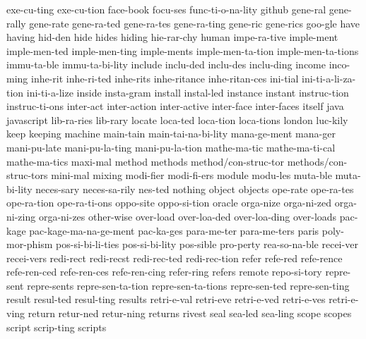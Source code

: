 {    exe-cu-ting
    exe-cu-tion
    face-book
    focu-ses
    func-ti-o-na-lity
    github
    gene-ral
    gene-rally
    gene-rate
    gene-ra-ted
    gene-ra-tes
    gene-ra-ting
    gene-ric
    gene-rics
    goo-gle
    have
    having
    hid-den
    hide
    hides
    hiding
    hie-rar-chy
    human
    impe-ra-tive
    imple-ment
    imple-men-ted
    imple-men-ting
    imple-ments
    imple-men-ta-tion
    imple-men-ta-tions
    immu-ta-ble
    immu-ta-bi-lity
    include
    inclu-ded
    inclu-des
    inclu-ding
    income
    inco-ming
    inhe-rit
    inhe-ri-ted
    inhe-rits
    inhe-ritance
    inhe-ritan-ces
    ini-tial
    ini-ti-a-li-za-tion
    ini-ti-a-lize
    inside
    insta-gram
    install
    instal-led
    instance
    instant
    instruc-tion
    instruc-ti-ons
    inter-act
    inter-action
    inter-active
    inter-face
    inter-faces
    itself
    java
    javascript
    lib-ra-ries
    lib-rary
    locate
    loca-ted
    loca-tion
    loca-tions
    london
    luc-kily
    keep
    keeping
    machine
    main-tain
    main-tai-na-bi-lity
    mana-ge-ment
    mana-ger
    mani-pu-late
    mani-pu-la-ting
    mani-pu-la-tion
    mathe-ma-tic
    mathe-ma-ti-cal
    mathe-ma-tics
    maxi-mal
    method
    methods
    method/con-struc-tor
    methods/con-struc-tors
    mini-mal
    mixing
    modi-fier
    modi-fi-ers
    module
    modu-les
    muta-ble
    muta-bi-lity
    neces-sary
    neces-sa-rily
    nes-ted
    nothing
    object
    objects
    ope-rate
    ope-ra-tes
    ope-ra-tion
    ope-ra-ti-ons
    oppo-site
    oppo-si-tion
    oracle
    orga-nize
    orga-ni-zed
    orga-ni-zing
    orga-ni-zes
    other-wise
    over-load
    over-loa-ded
    over-loa-ding
    over-loads
    pac-kage
    pac-kage-ma-na-ge-ment
    pac-ka-ges
    para-me-ter
    para-me-ters
    paris
    poly-mor-phism
    pos-si-bi-li-ties
    pos-si-bi-lity
    pos-sible
    pro-perty
    rea-so-na-ble
    recei-ver
    recei-vers
    redi-rect
    redi-recst
    redi-rec-ted
    redi-rec-tion
    refer
    refe-red
    refe-rence
    refe-ren-ced
    refe-ren-ces
    refe-ren-cing
    refer-ring
    refers
    remote
    repo-si-tory
    repre-sent
    repre-sents
    repre-sen-ta-tion
    repre-sen-ta-tions
    repre-sen-ted
    repre-sen-ting
    result
    resul-ted
    resul-ting
    results
    retri-e-val
    retri-eve
    retri-e-ved
    retri-e-ves
    retri-e-ving
    return
    retur-ned
    retur-ning
    returns
    rivest
    seal
    sea-led
    sea-ling
    scope
    scopes
    script
    scrip-ting
    scripts
}
